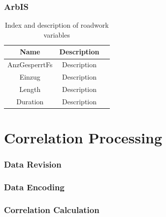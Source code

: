 \subsubsection{ArbIS}


\noindent
\begin{table}[ht]
	\centering
	\begin{tabular}{c|c|l} 
		\toprule
		Name & Description \\
		\midrule 
		AnzGesperrtFs & Description \\
		Einzug & Description \\
		Length & Description \\
		Duration & Description \\
		\bottomrule
	\end{tabular}
	\caption{Index and description of roadwork variables}
\end{table}
 
\section{Correlation Processing}
\label{methodology_correlation_processing}

\subsubsection{Data Revision}


\subsubsection{Data Encoding}


\subsubsection{Correlation Calculation}



